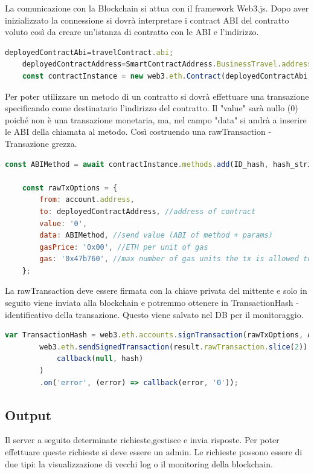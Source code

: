 \documentclass[11pt,a4paper,titlepage,twoside,openright]{report}
\begin{document}
La comunicazione con la Blockchain si attua con il framework Web3.js. Dopo aver inizializzato la connessione si dovrà interpretare i contract ABI del contratto voluto così da creare un'istanza di contratto con le ABI e l'indirizzo.
 
\begin{lstlisting}[language=JavaScript]
	deployedContractAbi=travelContract.abi;
	deployedContractAddress=SmartContractAddress.BusinessTravel.address;
	const contractInstance = new web3.eth.Contract(deployedContractAbi, deployedContractAddress);
\end{lstlisting}

Per poter utilizzare un metodo di un contratto si dovrà effettuare una transazione specificando come destinatario l'indirizzo del contratto. Il "value" sarà nullo (0) poiché non è una transazione monetaria, ma, nel campo "data" si andrà a inserire le ABI della chiamata al metodo. Così costruendo una rawTransaction - Transazione grezza.
\begin{lstlisting}[language=JavaScript]
	const ABIMethod = await contractInstance.methods.add(ID_hash, hash_string.toString()).encodeABI();

	const rawTxOptions = {
	    from: account.address,
	    to: deployedContractAddress, //address of contract
	    value: '0',
	    data: ABIMethod, //send value (ABI of method + params)
	    gasPrice: '0x00', //ETH per unit of gas
	    gas: '0x47b760', //max number of gas units the tx is allowed to use
  	};
\end{lstlisting}
La rawTransaction deve essere firmata con la chiave privata del mittente e solo in seguito viene inviata alla blockchain
e potremmo ottenere in TransactionHash - identificativo della transazione. Questo viene salvato nel DB per il monitoraggio.
\begin{lstlisting}[language=JavaScript]
  	var TransactionHash = web3.eth.accounts.signTransaction(rawTxOptions, AccountPrivateKey).then(async function(result){ 
	    web3.eth.sendSignedTransaction(result.rawTransaction.slice(2)).on('transactionHash',(hash) => 
            callback(null, hash)
        )
        .on('error', (error) => callback(error, '0'));
\end{lstlisting}

\subsection{Output}
Il server a seguito determinate richieste,gestisce e invia risposte. Per poter effettuare queste richieste si deve essere un admin. Le richieste possono essere di due tipi: la visualizzazione di vecchi log o il monitoring della blockchain.
\end{document}
